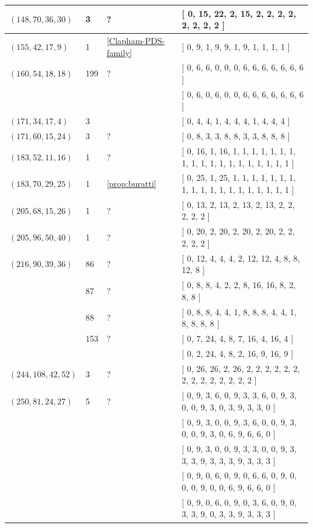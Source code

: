 \documentclass[12pt]{amsproc} %
\theoremstyle{definition}\newtheorem{defn}[thm]{Definition}
\theoremstyle{definition}\newtheorem{rem}[thm]{Remark}
\theoremstyle{definition}\newtheorem{ex}[thm]{Example}
\begin{document}
\begin{center}
\begin{longtable}{p{3.66cm}|P{0.8cm}|P{0.69cm}|p{10cm}}
		\hline
		 $(148, 70, 36, 30)$  & 3 & ? & [ 0, 15, 22, 2, 15, 2, 2, 2, 2, 2, 2, 2, 2 ] \\
		\hline
		 $(155, 42, 17, 9)$  & 1 & \ref{Clapham-PDS-family} & [ 0, 9, 1, 9, 9, 1, 9, 1, 1, 1, 1 ] \\
		\hline
		 $(160, 54, 18, 18)$  & 199 & ? & [ 0, 6, 6, 0, 0, 0, 6, 6, 6, 6, 6, 6, 6 ] \\
		   &  &  & [ 0, 6, 0, 6, 0, 0, 6, 6, 6, 6, 6, 6, 6 ] \\
		\hline
		 $(171, 34, 17, 4)$  & 3 & \cite{pol-dav-smi-swa} & [ 0, 4, 4, 1, 4, 4, 4, 1, 4, 4, 4 ] \\
		\hline
		 $(171, 60, 15, 24)$  & 3 & ? & [ 0, 8, 3, 3, 8, 8, 3, 3, 8, 8, 8 ] \\
		\hline
		 $(183, 52, 11, 16)$  & 1 & ? & [ 0, 16, 1, 16, 1, 1, 1, 1, 1, 1, 1, 1, 1, 1, 1, 1, 1, 1, 1, 1, 1, 1, 1 ] \\
		\hline
		 $(183, 70, 29, 25)$  & 1 & \ref{prop:buratti} & [ 0, 25, 1, 25, 1, 1, 1, 1, 1, 1, 1, 1, 1, 1, 1, 1, 1, 1, 1, 1, 1, 1, 1 ] \\
		\hline
		 $(205, 68, 15, 26)$  & 1 & ? & [ 0, 13, 2, 13, 2, 13, 2, 13, 2, 2, 2, 2, 2 ] \\
		\hline
		 $(205, 96, 50, 40)$  & 1 & ? & [ 0, 20, 2, 20, 2, 20, 2, 20, 2, 2, 2, 2, 2 ] \\
		\hline
		 $(216, 90, 39, 36)$  & 86 & ? & [ 0, 12, 4, 4, 4, 2, 12, 12, 4, 8, 8, 12, 8 ] \\
		   & 87 & ? & [ 0, 8, 8, 4, 2, 2, 8, 16, 16, 8, 2, 8, 8 ] \\
		   & 88 & ? & [ 0, 8, 8, 4, 4, 1, 8, 8, 8, 4, 4, 1, 8, 8, 8, 8 ] \\
		   & 153 & ? & [ 0, 7, 24, 4, 8, 7, 16, 4, 16, 4 ] \\
		   &  &  & [ 0, 2, 24, 4, 8, 2, 16, 9, 16, 9 ] \\
		\hline
		 $(244, 108, 42, 52)$  & 3 & ? & [ 0, 26, 26, 2, 26, 2, 2, 2, 2, 2, 2, 2, 2, 2, 2, 2, 2, 2, 2 ] \\
		\hline
		 $(250, 81, 24, 27)$  & 5 & ? & [ 0, 9, 3, 6, 0, 9, 3, 3, 6, 0, 9, 3, 0, 0, 9, 3, 0, 3, 9, 3, 3, 0 ] \\
		   &  &  & [ 0, 9, 3, 0, 0, 9, 3, 6, 0, 0, 9, 3, 0, 0, 9, 3, 0, 6, 9, 6, 6, 0 ] \\
		   &  &  & [ 0, 9, 3, 0, 0, 9, 3, 3, 0, 0, 9, 3, 3, 3, 9, 3, 3, 3, 9, 3, 3, 3 ] \\
		   &  &  & [ 0, 9, 0, 6, 0, 9, 0, 6, 6, 0, 9, 0, 0, 0, 9, 0, 0, 6, 9, 6, 6, 0 ] \\
		   &  &  & [ 0, 9, 0, 6, 0, 9, 0, 3, 6, 0, 9, 0, 3, 3, 9, 0, 3, 3, 9, 3, 3, 3 ] \\

\end{longtable}
\end{center}
\end{document}
